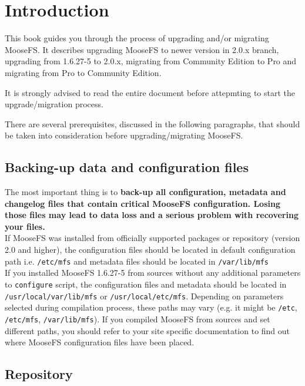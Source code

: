 \documentclass[a4paper,11pt,english]{report}
\def\code#1{\texttt{#1}}
\begin{document}
	\vfill
	
	\tableofcontents


	\chapter{Introduction}
	This book guides you through the process of upgrading and/or migrating MooseFS. It describes upgrading MooseFS to newer version in 2.0.x branch, upgrading from 1.6.27-5 to 2.0.x, migrating from Community Edition to Pro and migrating from Pro to Community Edition.
	
	It is strongly advised to read the entire document before attepmting to start the upgrade/migration process.
	
	There are several prerequisites, discussed in the following paragraphs, that should be taken into consideration before upgrading/migrating MooseFS.
	
		\section{Backing-up data and configuration files}
		The most important thing is to \textbf{back-up all configuration, metadata and changelog files that contain critical MooseFS configuration. Losing those files may lead to data loss and a serious problem with recovering your files.} \\

		If MooseFS was installed from officially supported packages or repository (version 2.0 and higher), the configuration files should be located in default configuration path i.e. \code{/etc/mfs} and metadata files should be located in \code{/var/lib/mfs}\\
		
		If you installed MooseFS 1.6.27-5 from sources without any additional parameters to \code{configure} script, the configuration files and metadata should be located in \code{/usr/local/var/lib/mfs} or \code{/usr/local/etc/mfs}. Depending on parameters selected during compilation process, these paths may vary (e.g. it might be \code{/etc}, \code{/etc/mfs}, \code{/var/lib/mfs}). If you compiled MooseFS from sources and set different paths, you should refer to your site specific documentation to find out where MooseFS configuration files have been placed.
		
		
\section{Repository}
\end{document}
